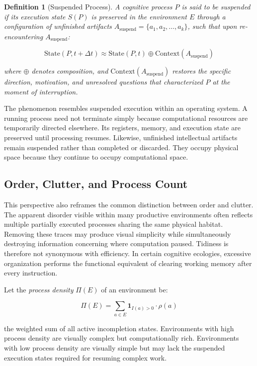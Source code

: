 \documentclass[12pt,oneside]{article}
\newtheorem{definition}{Definition}[section]
\theoremstyle{remark}
\begin{document}
\begin{definition}[Suspended Process]
A cognitive process $P$ is said to be suspended if its execution state $S(P)$ is preserved in the environment $E$ through a configuration of unfinished artifacts $A_{\text{suspend}} = \{a_1, a_2, \ldots, a_k\}$, such that upon re-encountering $A_{\text{suspend}}$:

\begin{equation}
\text{State}(P, t + \Delta t) \approx \text{State}(P, t) \oplus \text{Context}(A_{\text{suspend}})
\end{equation}

where $\oplus$ denotes composition, and $\text{Context}(A_{\text{suspend}})$ restores the specific direction, motivation, and unresolved questions that characterized $P$ at the moment of interruption.
\end{definition}

The phenomenon resembles suspended execution within an operating system. A running process need not terminate simply because computational resources are temporarily directed elsewhere. Its registers, memory, and execution state are preserved until processing resumes. Likewise, unfinished intellectual artifacts remain suspended rather than completed or discarded. They occupy physical space because they continue to occupy computational space.

\subsection{Order, Clutter, and Process Count}

This perspective also reframes the common distinction between order and clutter. The apparent disorder visible within many productive environments often reflects multiple partially executed processes sharing the same physical habitat. Removing these traces may produce visual simplicity while simultaneously destroying information concerning where computation paused. Tidiness is therefore not synonymous with efficiency. In certain cognitive ecologies, excessive organization performs the functional equivalent of clearing working memory after every instruction.

Let the \emph{process density} $\Pi(E)$ of an environment be:

\begin{equation}
\Pi(E) = \sum_{a \in E} \mathbf{1}_{I(a) > 0} \cdot \rho(a)
\end{equation}

the weighted sum of all active incompletion states. Environments with high process density are visually complex but computationally rich. Environments with low process density are visually simple but may lack the suspended execution states required for resuming complex work.
\end{document}
